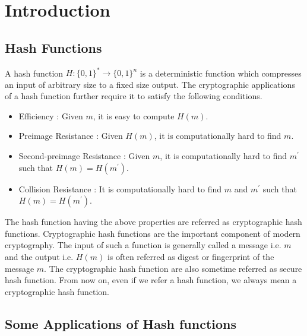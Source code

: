 \chapter{Introduction}
\label{chap:intro}

\section{Hash Functions}

A hash function $H:\{0,1\}^* \rightarrow \{0,1\}^n $ is a deterministic function which compresses an input of arbitrary size to a fixed size output. The cryptographic applications of a hash function further require it to satisfy the following conditions.

\begin{itemize}\setlength\itemindent{20pt}
    \item Efficiency : Given $m$, it is easy to compute $H(m)$.
    \item Preimage Resistance : Given $H(m)$, it is computationally hard to find $m$.
    \item Second-preimage Resistance : Given $m$, it is computationally hard to find $m^\prime$ such that $H(m)=H(m^\prime)$.
    \item Collision Resistance : It is computationally hard to find $m$ and $m^\prime$ such that $H(m)=H(m^\prime)$.
\end{itemize}

The hash function having the above properties are referred as cryptographic hash functions. Cryptographic hash functions are the important component of modern cryptography. The input of such a function is generally called a message i.e. $m$ and the output i.e. $H(m)$ is often referred as digest or fingerprint of the message $m$. The cryptographic hash function are also sometime referred as secure hash function. From now on, even if we refer a hash function, we always mean a cryptographic hash function.

\section{Some Applications of Hash functions}

